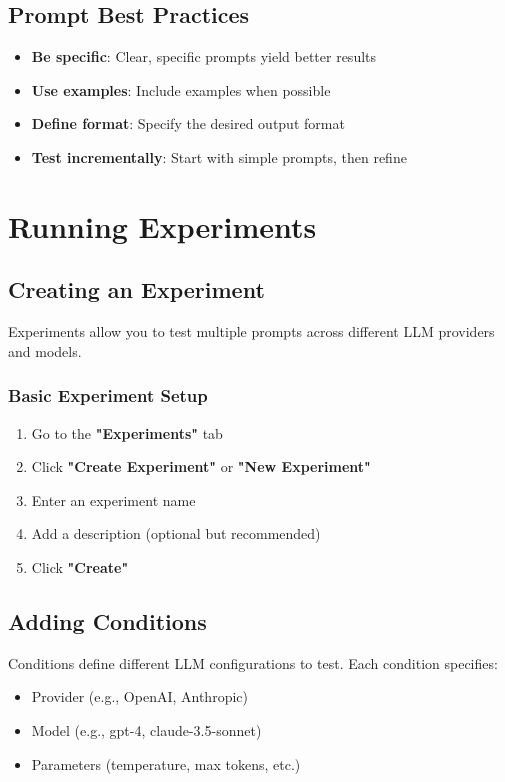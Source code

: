 \documentclass[11pt,a4paper]{article}
\begin{document}
\subsection{Prompt Best Practices}
\begin{itemize}
    \item \textbf{Be specific}: Clear, specific prompts yield better results
    \item \textbf{Use examples}: Include examples when possible
    \item \textbf{Define format}: Specify the desired output format
    \item \textbf{Test incrementally}: Start with simple prompts, then refine
\end{itemize}

\section{Running Experiments}
\label{sec:experiments}

\subsection{Creating an Experiment}
Experiments allow you to test multiple prompts across different LLM providers and models.

\subsubsection{Basic Experiment Setup}
\begin{enumerate}
    \item Go to the \textbf{"Experiments"} tab
    \item Click \textbf{"Create Experiment"} or \textbf{"New Experiment"}
    \item Enter an experiment name
    \item Add a description (optional but recommended)
    \item Click \textbf{"Create"}
\end{enumerate}

\subsection{Adding Conditions}
Conditions define different LLM configurations to test. Each condition specifies:
\begin{itemize}
    \item Provider (e.g., OpenAI, Anthropic)
    \item Model (e.g., gpt-4, claude-3.5-sonnet)
    \item Parameters (temperature, max tokens, etc.)
\end{itemize}
\end{document}
